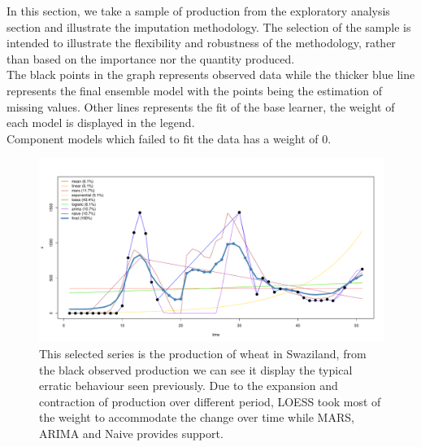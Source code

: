 \documentclass[nojss]{jss}\usepackage[]{graphicx}\usepackage[]{color}
\makeatletter
\def\maxwidth{ %
  \ifdim\Gin@nat@width>\linewidth
    \linewidth
  \else
    \Gin@nat@width
  \fi
}
\newenvironment{knitrout}{}{} %
\makeatother
\begin{document}
In this section, we take a sample of production from the exploratory
analysis section and illustrate the imputation methodology. The
selection of the sample is intended to illustrate the flexibility and
robustness of the methodology, rather than based on the importance nor
the quantity produced.\\

The black points in the graph represents observed data while the
thicker blue line represents the final ensemble model with the points
being the estimation of missing values. Other lines represents the fit
of the base learner, the weight of each model is displayed in the
legend.\\

Component models which failed to fit the data has a weight of 0.\\

\begin{knitrout}
\color{fgcolor}\begin{figure}[!ht]


{\centering \includegraphics[width=\maxwidth]{figure/wheat-swaziland-impute} 

}

\caption[This selected series is the production of wheat in Swaziland, from the black observed production we can see it display the typical erratic behaviour seen previously]{This selected series is the production of wheat in Swaziland, from the black observed production we can see it display the typical erratic behaviour seen previously. Due to the expansion and contraction of production over different period, LOESS took most of the weight to accommodate the change over time while MARS, ARIMA and Naive provides support.\label{fig:wheat-swaziland-impute}}
\end{figure}


\end{knitrout}
\end{document}
